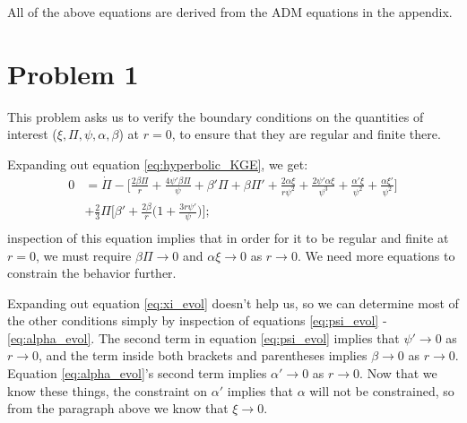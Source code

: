 \documentclass[12pt]{article}
\numberwithin{equation}{section}
\begin{document}
All of the above equations are derived from the ADM equations in the appendix.

\section{Problem 1}
This problem asks us to verify the boundary conditions on the quantities of interest ($\xi, \Pi, \psi, \alpha, \beta$) at $r = 0$, to ensure that they are regular and finite there.

Expanding out equation \ref{eq:hyperbolic_KGE}, we get:
\begin{equation}
\begin{aligned}
0 &= \dot{\Pi} - \Big[ \frac{2 \beta \Pi}{r} + \frac{4 \psi' \beta \Pi}{\psi} + \beta' \Pi + \beta \Pi' + \frac{2 \alpha \xi}{r \psi^2} + \frac{2 \psi' \alpha \xi}{\psi^3} + \frac{\alpha' \xi}{\psi^2} + \frac{\alpha \xi'}{\psi^2} \Big] \\
&+ \frac{2}{3} \Pi \Big[ \beta' + \frac{2 \beta}{r} \Big(1 + \frac{3 r \psi'}{\psi} \Big) \Big]; \\
\end{aligned}
\end{equation}
inspection of this equation implies that in order for it to be regular and finite at $r = 0$, we must require $\beta \Pi \to 0$ and $\alpha \xi \to 0$ as $r \to 0$.  We need more equations to constrain the behavior further.

Expanding out equation \ref{eq:xi_evol} doesn't help us, so we can determine most of the other conditions simply by inspection of equations \ref{eq:psi_evol} - \ref{eq:alpha_evol}.  The second term in equation \ref{eq:psi_evol} implies that $\psi' \to 0$ as $r \to 0$, and the term inside both brackets and parentheses implies $\beta \to 0$ as $r \to 0$.  Equation \ref{eq:alpha_evol}'s second term implies $\alpha' \to 0$ as $r \to 0$.  Now that we know these things, the constraint on $\alpha'$ implies that $\alpha$ will not be constrained, so from the paragraph above we know that $\xi \to 0$.  
\end{document}
